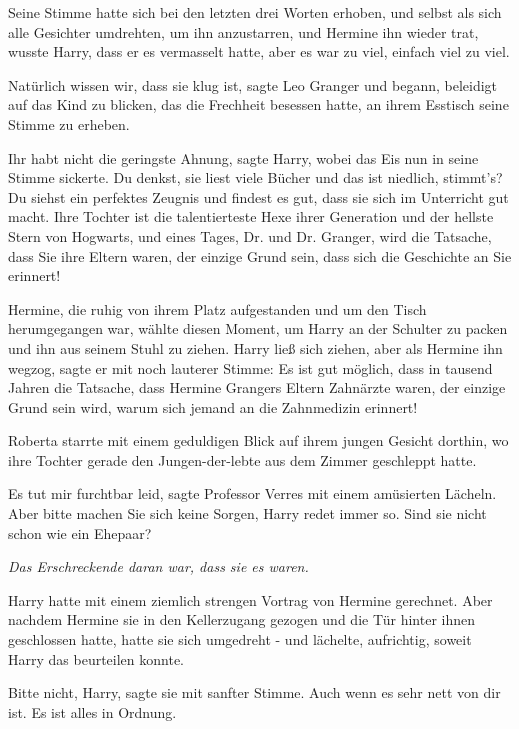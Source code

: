 Seine Stimme hatte sich bei den letzten drei Worten erhoben, und selbst als sich
alle Gesichter umdrehten, um ihn anzustarren, und Hermine ihn wieder trat,
wusste Harry, dass er es vermasselt hatte, aber es war zu viel, einfach viel zu
viel.

\glqq{}Natürlich wissen wir, dass sie klug ist\grqq{}, sagte Leo Granger und
begann, beleidigt auf das Kind zu blicken, das die Frechheit besessen hatte, an
ihrem Esstisch seine Stimme zu erheben.

\glqq{}Ihr habt nicht die geringste Ahnung\grqq{}, sagte Harry, wobei das Eis nun
in seine Stimme sickerte. \glqq{}Du denkst, sie liest viele Bücher und das ist
niedlich, stimmt's? Du siehst ein perfektes Zeugnis und findest es gut, dass sie
sich im Unterricht gut macht. Ihre Tochter ist die talentierteste Hexe ihrer
Generation und der hellste Stern von Hogwarts, und eines Tages, Dr. und Dr.
Granger, wird die Tatsache, dass Sie ihre Eltern waren, der einzige Grund sein,
dass sich die Geschichte an Sie erinnert!\grqq{}

Hermine, die ruhig von ihrem Platz aufgestanden und um den Tisch herumgegangen
war, wählte diesen Moment, um Harry an der Schulter zu packen und ihn aus seinem
Stuhl zu ziehen. Harry ließ sich ziehen, aber als Hermine ihn wegzog, sagte er
mit noch lauterer Stimme: \glqq{}Es ist gut möglich, dass in tausend Jahren die
Tatsache, dass Hermine Grangers Eltern Zahnärzte waren, der einzige Grund sein
wird, warum sich jemand an die Zahnmedizin erinnert!\grqq{}

Roberta starrte mit einem geduldigen Blick auf ihrem jungen Gesicht dorthin, wo
ihre Tochter gerade den Jungen-der-lebte aus dem Zimmer geschleppt hatte.

\glqq{}Es tut mir furchtbar leid\grqq{}, sagte Professor Verres mit einem
amüsierten Lächeln. \glqq{}Aber bitte machen Sie sich keine Sorgen, Harry redet
immer so. Sind sie nicht schon wie ein Ehepaar?\grqq{}

\emph{Das Erschreckende daran war, dass sie es waren.}

Harry hatte mit einem ziemlich strengen Vortrag von Hermine gerechnet. Aber
nachdem Hermine sie in den Kellerzugang gezogen und die Tür hinter ihnen
geschlossen hatte, hatte sie sich umgedreht - und lächelte, aufrichtig, soweit
Harry das beurteilen konnte.

\glqq{}Bitte nicht, Harry\grqq{}, sagte sie mit sanfter Stimme. \glqq{}Auch wenn
es sehr nett von dir ist. Es ist alles in Ordnung.\grqq{}

